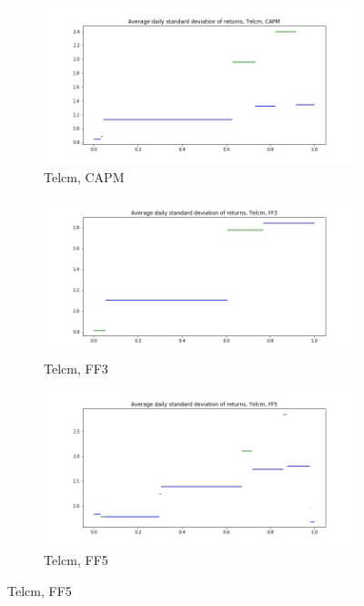 \documentclass{article}
\begin{document}
  \begin{figure}
  \centering
  \begin{subfigure}[b]{0.3\textwidth}
    \centering
    \includegraphics[width=\textwidth]{Telcm/daily_stdevCAPM.jpg}
    \caption{Telcm, CAPM}
    \label{fig:1}
  \end{subfigure}
  \begin{subfigure}[b]{0.3\textwidth}
    \centering
    \includegraphics[width=\textwidth]{Telcm/daily_stdevFF3.jpg}
    \caption{Telcm, FF3}
    \label{fig:2}
  \end{subfigure}
    \begin{subfigure}[b]{0.3\textwidth}
    \centering
    \includegraphics[width=\textwidth]{Telcm/daily_stdevFF5.jpg}
    \caption{Telcm, FF5}
    \label{fig:1}
  \end{subfigure}
  \end{figure}
  
\end{document}
